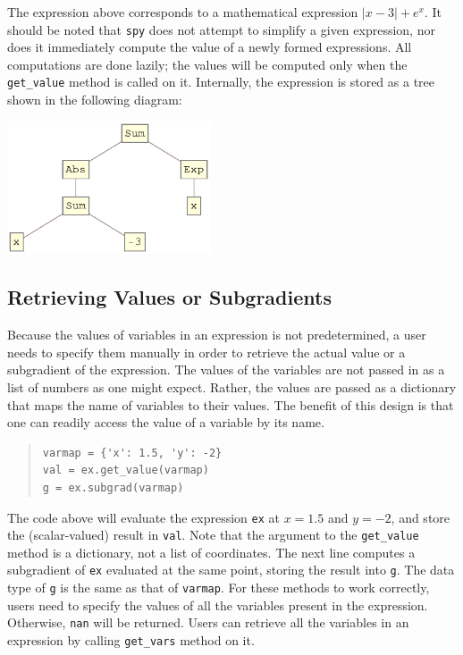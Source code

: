 \documentclass[12pt]{article}
\begin{document}
\noindent The expression above corresponds to a mathematical expression
$|x-3|+e^x$. It should be noted that \verb'spy' does not attempt to
simplify a given expression, nor does it immediately compute the value of
a newly formed expressions. All computations are done lazily; the
values will be computed only when the \verb'get_value' method is called on
it. Internally, the expression is stored as a tree shown in the following diagram:

\begin{center}
\includegraphics[width=0.45\textwidth]{expr}
\end{center}

\subsection{Retrieving Values or Subgradients}
Because the values of variables in an expression is not predetermined, a user needs to specify them manually in order to retrieve the actual value or a subgradient of the expression. The values of the variables are not passed in as a list of numbers as one might expect. Rather, the values are passed as a dictionary that maps the name of variables to their values. The benefit of this design is that one can readily access the value of a variable by its name.

\begin{quote}
\begin{verbatim}
varmap = {'x': 1.5, 'y': -2}
val = ex.get_value(varmap)
g = ex.subgrad(varmap)
\end{verbatim}
\end{quote}

\noindent The code above will evaluate the expression \verb'ex' at $x=1.5$ and $y=-2$, and store the (scalar-valued) result in \verb'val'. Note that the argument to the \verb'get_value' method is a dictionary, not a list of coordinates. The next line computes a subgradient of \verb'ex' evaluated at the same point, storing the result into \verb'g'. The data type of \verb'g' is the same as that of \verb'varmap'. For these methods to work correctly, users need to specify the values of all the variables present in the expression. Otherwise, \verb'nan' will be returned. Users can retrieve all the variables in an expression by calling \verb'get_vars' method on it.
\end{document}
